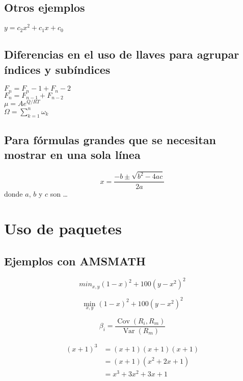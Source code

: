 \documentclass[12pt,a4paper]{article}
\begin{document}
\subsection*{Otros ejemplos}

$y = c_2 x^2 + c_1 x + c_0$

\subsection*{Diferencias en el uso de llaves para agrupar índices y subíndices}

$F_n = F_n-1 + F_n-2$\\

$F_n = F_{n-1} + F_{n-2}$\\

$\mu = A e^{Q/RT}$\\

$\Omega=\sum_{k=1}^{n}\omega_k$

\subsection*{Para fórmulas grandes que se necesitan mostrar en una sola línea}

\begin{equation}
x = \frac{-b \pm \sqrt{b^2 - 4ac}}{2a}
\end{equation}
donde $a$, $b$ y $c$ son \ldots


\section*{Uso de paquetes}

\subsection*{Ejemplos con AMSMATH}

\begin{equation*}
min_{x,y}{(1-x)^2 + 100(y-x^2)^2} %
\end{equation*}

\begin{equation*}
\min_{x,y}{(1-x)^2 + 100(y-x^2)^2} %
\end{equation*}

\begin{equation*}
\beta_i=
\frac{\operatorname{Cov}(R_i, R_m)}
	 {\operatorname{Var}(R_m)}
\end{equation*}

\begin{align*}
(x+1)^3 &= (x+1)(x+1)(x+1)\\
		&= (x+1)(x^2 + 2x + 1)\\
		&= x^3 + 3x^2 + 3x + 1
\end{align*}
\end{document}

